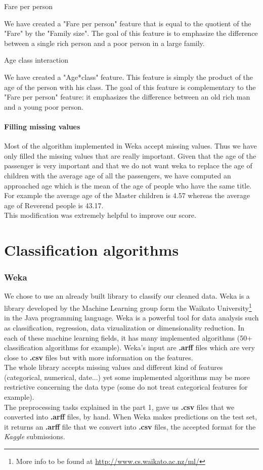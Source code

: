 \documentclass[11pt,a4paper,portrait]{article}
\begin{document}
\subparagraph{Fare per person}
We have created a "Fare per person" feature that is equal to the quotient of the "Fare" by the "Family size". The goal of this feature is to emphasize the difference between a single rich person and a poor person in a large family.

\subparagraph{Age class interaction}
We have created a "Age*class" feature. This feature is simply the product of the age of the person with his class. The goal of this feature is complementary to the "Fare per person" feature: it emphasizes the difference between an old rich man and a young poor person.


\subsection{Filling missing values}
Most of the algorithm implemented in Weka accept missing values. Thus we have only filled the missing values that are really important. Given that the age of the passenger is very important and that we do not want weka to replace the age of children with the average age of all the passengers, we have computed an approached age which is the mean of the age of people who have the same title. For example the average age of the Master children is 4.57 whereas the average age of Reverend people is 43.17.\\
This modification was extremely helpful to improve our score.


\part{Classification algorithms}
\setcounter{section}{0}

\section{Weka}
We chose to use an already built library to classify our cleaned data. Weka is a library developed by the Machine Learning group form the Waikato University\footnote{More info to be found at \url{http://www.cs.waikato.ac.nz/ml/}} in the Java programming language. Weka is a powerful tool for data analysis such as classification, regression, data vizualization or dimensionality reduction. In each of these machine learning fields, it has many implemented algorithms (50+ classification algorithms for example). Weka's input are \textbf{.arff} files which are very close to \textbf{.csv} files but with more information on the features.\\
The whole library accepts missing values and different kind of features (categorical, numerical, date...) yet some implemented algorithms may be more restrictive concerning the data type (some do not treat categorical features for example).\\
The preprocessing tasks explained in the part 1, gave us \textbf{.csv} files that we converted into \textbf{.arff} files, by hand. When Weka makes predictions on the test set, it returns an \textbf{.arff} file that we convert into \textbf{.csv} files, the accepted format for the \textit{Kaggle} submissions.
\end{document}

